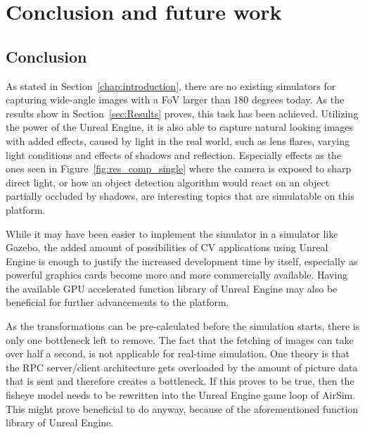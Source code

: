 
\chapter{Conclusion and future work}
\section{Conclusion}
As stated in Section~\ref{chap:introduction}, there are no existing simulators for capturing wide-angle images with a FoV larger than 180 degrees today. As the results show in Section~\ref{sec:Results} proves, this task has been achieved. Utilizing the power of the Unreal Engine, it is also able to capture natural looking images with added effects, caused by light in the real world, such as lens flares, varying light conditions and effects of shadows and reflection. Especially effects as the ones seen in Figure~\ref{fig:res_comp_single} where the camera is exposed to sharp direct light, or how an object detection algorithm would react on an object partially occluded by shadows, are interesting topics that are simulatable on this platform.

While it may have been easier to implement the simulator in a simulator like Gazebo, the added amount of possibilities of CV applications using Unreal Engine is enough to justify the increased development time by itself, especially as powerful graphics cards become more and more commercially available. Having the available GPU accelerated function library of Unreal Engine may also be beneficial for further advancements to the platform.

As the transformations can be pre-calculated before the simulation starts, there is only one bottleneck left to remove. The fact that the fetching of images can take over half a second, is not applicable for real-time simulation. One theory is that the RPC server/client architecture gets overloaded by the amount of picture data that is sent and therefore creates a bottleneck. If this proves to be true, then the fisheye model needs to be rewritten into the Unreal Engine game loop of AirSim. This might prove beneficial to do anyway, because of the aforementioned function library of Unreal Engine.

